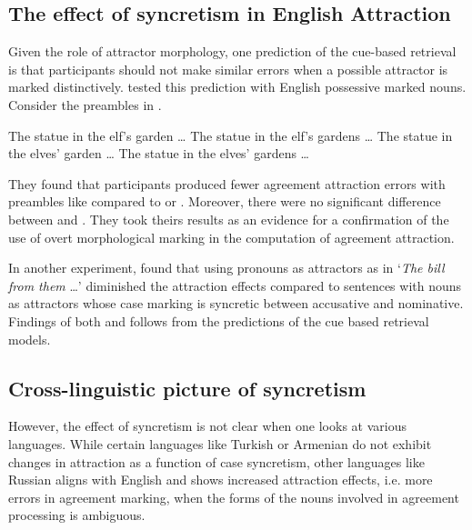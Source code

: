 \documentclass[10pt,letterpaper]{article}
\begin{document}
\subsection{The effect of syncretism in English Attraction}

Given the role of attractor morphology, one prediction of the cue-based retrieval is that participants should not make similar errors when a possible attractor is marked distinctively.  tested this prediction with English possessive marked nouns. Consider the preambles in \Next{}. \vspace{-0.5em}

\ea 
    \ea\label{elfa} The statue in the elf’s garden \ldots{}\vspace{-0.2em}
    \ex\label{elfb} The statue in the elf’s gardens \ldots{}\vspace{-0.2em}
    \ex\label{elfc} The statue in the elves' garden \ldots{}\vspace{-0.2em}
    \ex\label{elfd} The statue in the elves' gardens \ldots{}\vspace{-0.5em}
    \z
\z

They found that participants produced fewer agreement attraction errors with preambles like  compared to  or . Moreover, there were no significant difference between  and . They took theirs results as an evidence for a confirmation of the use of overt morphological marking in the computation of agreement attraction. 

In another experiment,  found that using pronouns as attractors as in `\textit{The bill from them} \ldots' diminished the attraction effects compared to sentences with nouns as attractors whose case marking is syncretic between accusative and nominative. Findings of both  and \cite{NicolEtAl2016} follows from the predictions of the cue based retrieval models.

\subsection{Cross-linguistic picture of syncretism}

However, the effect of syncretism is not clear when one looks at various languages. While certain languages like Turkish or Armenian do not exhibit changes in attraction as a function of case syncretism, other languages like Russian aligns with English and shows increased attraction effects, i.e. more errors in agreement marking, when the forms of the nouns involved in agreement processing is ambiguous. 
\end{document}
